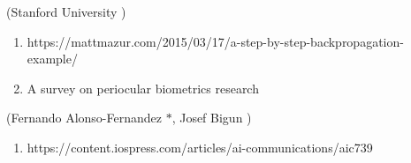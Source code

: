 \documentclass{article} %
\begin{document}
\noindent       (Stanford University )

\begin{enumerate}
\item  https://mattmazur.com/2015/03/17/a-step-by-step-backpropagation-example/

\item  A survey on periocular biometrics research
\end{enumerate}

\noindent       (Fernando Alonso-Fernandez $\mathrm{\ast }$, Josef Bigun )

\begin{enumerate}
\item  https://content.iospress.com/articles/ai-communications/aic739
\end{enumerate}

\noindent 

\noindent 

\noindent 

\noindent 
\end{document}
